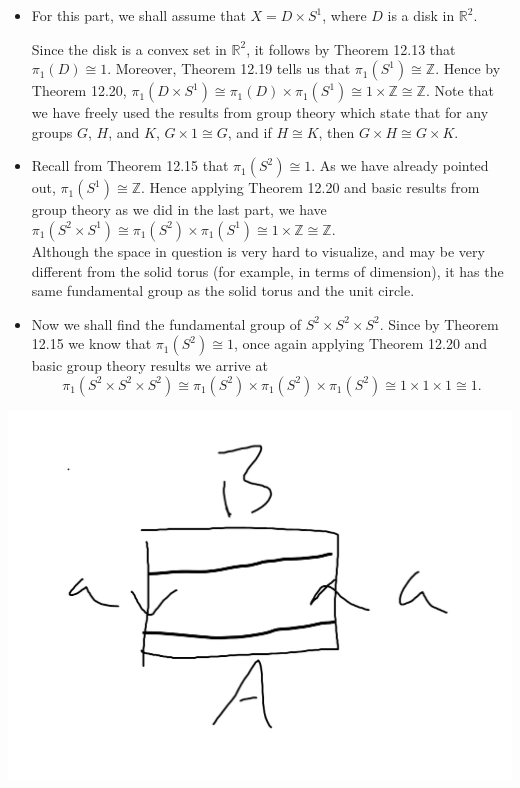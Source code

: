 \documentclass{article}
\newcommand{\Z}{\mathbb{Z}}
\newcommand{\R}{\mathbb{R}}
\newcommand{\Z}{\mathbb{Z}}
\newcommand{\R}{\mathbb{R}}
\begin{document}
\begin{itemize}
    \item For this part, we shall assume that $X = D\times S^1$, where $D$ is a disk in $\R^2$.
    
    Since the disk is a convex set in $\R^2$, it follows by Theorem 12.13 that $\pi_1(D) \cong 1$. Moreover, Theorem 12.19 tells us that $\pi_1(S^1) \cong \Z$. Hence by Theorem 12.20, $\pi_1(D\times S^1) \cong \pi_1(D)\times \pi_1(S^1)\cong 1\times \Z \cong \Z$. Note that we have freely used the results from group theory which state that for any groups $G$, $H$, and $K$, $G\times 1\cong G$, and if $H\cong K$, then $G\times H \cong G\times K$. 
    \item Recall from Theorem 12.15 that $\pi_1(S^2) \cong 1$. As we have already pointed out, $\pi_1(S^1) \cong \Z$. Hence applying Theorem 12.20 and basic results from group theory as we did in the last part, we have $\pi_1(S^2 \times S^1)\cong \pi_1(S^2)\times \pi_1(S^1) \cong 1\times \Z\cong \Z$. \\
    
    Although the space in question is very hard to visualize, and may be very different from the solid torus (for example, in terms of dimension), it has the same fundamental group as the solid torus and the unit circle.
    \item Now we shall find the fundamental group of $S^2\times S^2 \times S^2$. Since by Theorem 12.15 we know that $\pi_1(S^2)\cong 1$, once again applying Theorem 12.20 and basic group theory results we arrive at 
    $$\pi_1(S^2 \times S^2 \times S^2) \cong \pi_1(S^2)\times \pi_1(S^2)\times \pi_1(S^2) \cong 1\times 1\times 1 \cong 1.$$
\end{itemize}

\includegraphics[scale=\linewidth]{homework/mobiusstrip.png}
\end{document}

